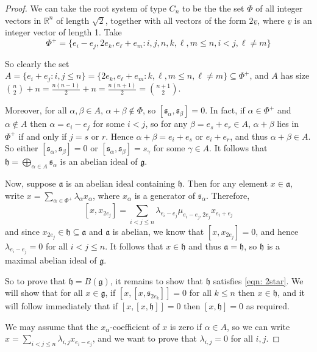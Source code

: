 \documentclass[10pt,a4paper]{amsart}
\begin{document}
\begin{proof}

We can take the root system of type $C_n$ to be the the set $\Phi$ of all integer vectors in $\mathbb{R}^n$ of length $\sqrt{2}$, together with all vectors of the form $2\underline{v}$, where $\underline{v}$ is an integer vector of length 1. Take $$\Phi^+=\{e_i-e_j,2e_k,e_\ell+e_m:i,j,n,k,\ell,m\leq n, i<j,\ell\neq m\}$$

So clearly the set $A=\{e_i+e_j:i,j\leq n\}=\{2e_k,e_\ell+e_m:k,\ell,m\leq n,\ell\neq m\}\subseteq\Phi^+$, and $A$ has size $\binom{n}{2}+n=\frac{n(n-1)}{2}+n=\frac{n(n+1)}{2}=\binom{n+1}{2}$.

Moreover, for all $\alpha,\beta\in A$, $\alpha+\beta\notin\Phi$, so $[\mathfrak{s}_\alpha,\mathfrak{s}_\beta]=0$. In fact, if $\alpha\in\Phi^+$ and $\alpha\notin A$ then $\alpha=e_i-e_j$ for some $i<j$, so for any $\beta=e_s+e_r\in A$, $\alpha+\beta$ lies in $\Phi^+$ if and only if $j=s$ or $r$. Hence $\alpha+\beta=e_i+e_s$ or $e_i+e_r$, and thus $\alpha+\beta\in A$. So either $[\mathfrak{s}_\alpha,\mathfrak{s}_\beta]=0$ or $[\mathfrak{s}_\alpha,\mathfrak{s}_\beta]=s_\gamma$ for some $\gamma\in A$. It follows that $\mathfrak{h}=\underset{\alpha\in A}{\bigoplus}\mathfrak{s}_\alpha$ is an abelian ideal of $\mathfrak{g}$.

Now, suppose $\mathfrak{a}$ is an abelian ideal containing $\mathfrak{h}$. Then for any element $x\in\mathfrak{a}$, write $x=\underset{\alpha\in\Phi^+}{\sum}\lambda_\alpha x_\alpha$, where $x_{\alpha}$ is a generator of $\mathfrak{s}_{\alpha}$. Therefore, $$[x,x_{2e_j}]=\underset{i<j\leq n}{\sum}\lambda_{e_i-e_j}\mu_{e_i-e_j,2e_j}x_{e_i+e_j}$$ and since $x_{2e_j}\in\mathfrak{h}\subseteq\mathfrak{a}$ and $\mathfrak{a}$ is abelian, we know that $[x,x_{2e_j}]=0$, and hence $\lambda_{e_i-e_j}=0$ for all $i<j\leq n$. It follows that $x\in\mathfrak{h}$ and thus $\mathfrak{a}=\mathfrak{h}$, so $\mathfrak{h}$ is a maximal abelian ideal of $\mathfrak{g}$. 

So to prove that $\mathfrak{h}=B(\mathfrak{g})$, it remains to show that $\mathfrak{h}$ satisfies \eqref{eqn: 2star}. We will show that for all $x\in\mathfrak{g}$, if $[x,[x,\mathfrak{s}_{2e_k}]]=0$ for all $k\leq n$ then $x\in\mathfrak{h}$, and it will follow immediately that if $[x,[x,\mathfrak{h}]]=0$ then $[x,\mathfrak{h}]=0$ as required.

We may assume that the $x_{\alpha}$-coefficient of $x$ is zero if $\alpha\in A$, so we can write $x=\underset{i<j\leq n}{\sum}\lambda_{i,j}x_{e_i-e_j}$, and we want to prove that $\lambda_{i,j}=0$ for all $i,j$.


\end{proof}
\end{document}
